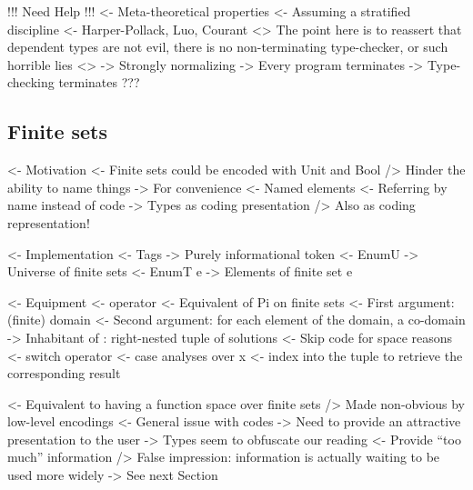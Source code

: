 \documentclass{article}
\newenvironment{structure}{\footnotesize\verbatim}{\endverbatim}
\begin{document}
\begin{structure}
!!! Need Help !!!
<- Meta-theoretical properties
    <- Assuming a stratified discipline
        <- Harper-Pollack, Luo, Courant
    <> The point here is to reassert that dependent types are not evil, 
       there is no non-terminating type-checker, or such horrible lies <>
    -> Strongly normalizing
        -> Every program terminates
    -> Type-checking terminates
    ???
\end{structure}

\subsection{Finite sets}

\begin{structure}
<- Motivation
    <- Finite sets could be encoded with Unit and Bool
        /> Hinder the ability to name things
    -> For convenience
        <- Named elements
        <- Referring by name instead of code
        -> Types as coding presentation
            /> Also as coding representation!
\end{structure}

\begin{structure}
<- Implementation
    <- Tags
        -> Purely informational token
    <- EnumU
        -> Universe of finite sets
    <- EnumT e
        -> Elements of finite set e
\end{structure}

\begin{structure}
<- Equipment
    <- \spi operator
        <- Equivalent of Pi on finite sets
        <- First argument: (finite) domain
        <- Second argument: for each element of the domain, a co-domain
        -> Inhabitant of \spi: right-nested tuple of solutions
            <- Skip code for space reasons
    <- switch operator
        <- case analyses over x
        <- index into the \spi tuple to retrieve the corresponding result
\end{structure}

\begin{structure}
<- Equivalent to having a function space over finite sets
    /> Made non-obvious by low-level encodings
        <- General issue with codes
             -> Need to provide an attractive presentation to the user
    -> Types seem to obfuscate our reading
        <- Provide ``too much'' information
        /> False impression: information is actually waiting to be used more widely
        -> See next Section
\end{structure}
\end{document}
